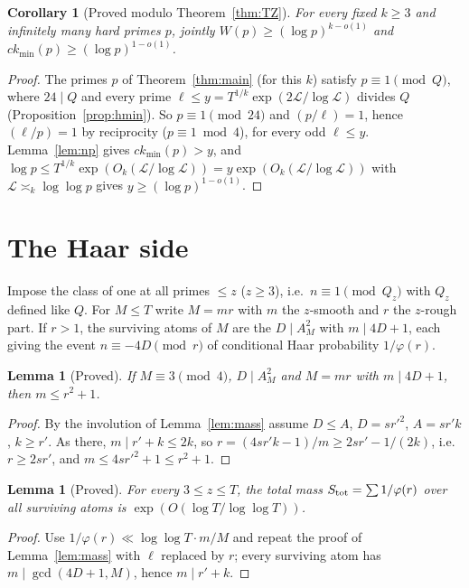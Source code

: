 \documentclass[11pt,reqno]{amsart}
\newtheorem{lemma}[theorem]{Lemma}
\newtheorem{corollary}[theorem]{Corollary}
\theoremstyle{definition}
\newcommand{\ckmin}{ck_{\min}}
\newcommand{\Lc}{\mathcal L}
\begin{document}
\begin{corollary}[Proved modulo Theorem~\ref{thm:TZ}]\label{cor:joint}
For every fixed $k\ge3$ and infinitely many hard primes $p$, jointly
$W(p)\ge(\log p)^{k-o(1)}$ and $\ckmin(p)\ge(\log p)^{1-o(1)}$.
\end{corollary}

\begin{proof}
The primes $p$ of Theorem~\ref{thm:main} (for this $k$) satisfy $p\equiv1\pmod Q$,
where $24\mid Q$ and every prime $\ell\le y=T^{1/k}\exp(2\Lc/\log\Lc)$ divides $Q$
(Proposition~\ref{prop:hmin}).  So $p\equiv1\pmod{24}$ and $(p/\ell)=1$, hence
$(\ell/p)=1$ by reciprocity ($p\equiv1\bmod4$), for every odd $\ell\le y$.
Lemma~\ref{lem:np} gives $\ckmin(p)>y$, and $\log p\le T^{1/k}\exp(O_k(\Lc/\log\Lc))=y\exp(O_k(\Lc/\log\Lc))$
with $\Lc\asymp_k\log\log p$ gives $y\ge(\log p)^{1-o(1)}$.
\end{proof}

\section{The Haar side}\label{sec:haar}

Impose the class of one at all primes $\le z$ ($z\ge3$), i.e.\ $n\equiv1\pmod{Q_z}$
with $Q_z$ defined like $Q$.  For $M\le T$ write $M=mr$ with $m$ the $z$-smooth
and $r$ the $z$-rough part.  If $r>1$, the surviving atoms of $M$ are the
$D\mid A_M^2$ with $m\mid4D+1$, each giving the event $n\equiv-4D\pmod r$ of
conditional Haar probability $1/\varphi(r)$.

\begin{lemma}[Proved]\label{lem:struct}
If $M\equiv3\pmod4$, $D\mid A_M^2$ and $M=mr$ with $m\mid4D+1$, then $m\le r^2+1$.
\end{lemma}

\begin{proof}
By the involution of Lemma~\ref{lem:mass} assume $D\le A$, $D=sr'^2$,
$A=sr'k$, $k\ge r'$.  As there, $m\mid r'+k\le2k$, so
$r=(4sr'k-1)/m\ge2sr'-1/(2k)$, i.e.\ $r\ge2sr'$, and
$m\le4sr'^2+1\le r^2+1$.
\end{proof}

\begin{lemma}[Proved]\label{lem:globalmass}
For every $3\le z\le T$, the total mass $S_{\rm tot}=\sum1/\varphi(r)$ over all
surviving atoms is $\exp(O(\log T/\log\log T))$.
\end{lemma}

\begin{proof}
Use $1/\varphi(r)\ll\log\log T\cdot m/M$ and repeat the proof of
Lemma~\ref{lem:mass} with $\ell$ replaced by $r$; every surviving atom has
$m\mid\gcd(4D+1,M)$, hence $m\mid r'+k$.
\end{proof}
\end{document}
